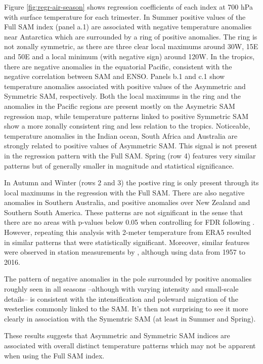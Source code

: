 \documentclass[]{ametsocV5}
\begin{document}
Figure \ref{fig:regr-air-season} shows regression coefficients of each
index at 700 hPa with surface temperature for each trimester. In Summer
positive values of the Full SAM index (panel a.1) are associated with
negative temperature anomalies near Antarctica which are surrounded by a
ring of positive anomalies. The ring is not zonally symmetric, as there
are three clear local maximums around 30\degree W, 15\degree E and
50\degree E and a local minimum (with negative sign) around
120\degree W. In the tropics, there are negative anomalies in the
equatorial Pacific, consistent with the negative correlation between SAM
and ENSO. Panels b.1 and c.1 show temperature anomalies associated with
positive values of the Asymmetric and Symmetric SAM, respectively. Both
the local maximums in the ring and the anomalies in the Pacific regions
are present mostly on the Asymetric SAM regression map, while
temperature patterns linked to positive Symmetric SAM show a more
zonally consistent ring and less relation to the tropics. Noticeable,
temperature anomalies in the Indian ocean, South Africa and Australia
are strongly related to positive values of Asymmetric SAM. This signal
is not present in the regression pattern with the Full SAM. Spring (row
4) features very similar patterns but of generally smaller in magnitude
and statistical significance.

In Autumn and Winter (rows 2 and 3) the postive ring is only present
through its local maximums in the regression with the Full SAM. There
are also negative anomalies in Southern Australia, and positive
anomalies over New Zealand and Southern South America. These patterns
are not significant in the sense that there are no areas with p-values
below 0.05 when controlling for FDR following \citet{wilks2016}.
However, repeating this analysis with 2-meter temperature from ERA5
resulted in similar patterns that were statistically significant.
Moreover, similar features were observed in station measurements by
\citet{jones2019}, although using data from 1957 to 2016.

The pattern of negative anomalies in the pole surrounded by positive
anomalies roughly seen in all seasons --although with varying intensity
and small-scale details-- is consistent with the intensification and
poleward migration of the westerlies commonly linked to the SAM. It's
then not surprising to see it more clearly in association with the
Symemtric SAM (at least in Summer and Spring).

These results suggests that Asymmetric and Symmetric SAM indices are
associated with overall distinct temperature patterns which may not be
apparent when using the Full SAM index.
\end{document}
